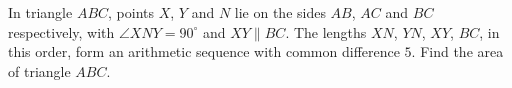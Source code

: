 In triangle $ABC$, points $X$, $Y$ and $N$ lie on the sides $AB$, $AC$ and $BC$ respectively, with $\angle XNY=90^\circ$ and $XY\parallel BC$. The lengths $XN$, $YN$, $XY$, $BC$, in this order, form an arithmetic sequence with common difference $5$. Find the area of triangle $ABC$.
